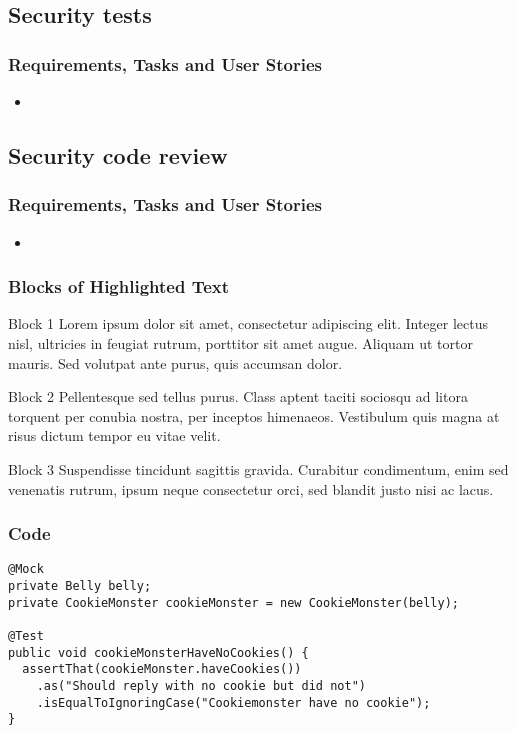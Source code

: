 \documentclass{beamer}
\begin{document}
  \subsection{Security tests}
    \begin{frame}
    \frametitle{Requirements, Tasks and User Stories}
    \begin{itemize}
    \item
    \end{itemize}
    \end{frame}

  \subsection{Security code review}
    \begin{frame}
    \frametitle{Requirements, Tasks and User Stories}
    \begin{itemize}
    \item
    \end{itemize}
    \end{frame}

\begin{frame}
\frametitle{Blocks of Highlighted Text}
\begin{block}{Block 1}
Lorem ipsum dolor sit amet, consectetur adipiscing elit. Integer lectus nisl, ultricies in feugiat rutrum, porttitor sit amet augue. Aliquam ut tortor mauris. Sed volutpat ante purus, quis accumsan dolor.
\end{block}

\begin{block}{Block 2}
Pellentesque sed tellus purus. Class aptent taciti sociosqu ad litora torquent per conubia nostra, per inceptos himenaeos. Vestibulum quis magna at risus dictum tempor eu vitae velit.
\end{block}

\begin{block}{Block 3}
Suspendisse tincidunt sagittis gravida. Curabitur condimentum, enim sed venenatis rutrum, ipsum neque consectetur orci, sed blandit justo nisi ac lacus.
\end{block}
\end{frame}

\begin{frame}[fragile]
\frametitle{Code}
\begin{example}[Code]
\begin{lstlisting}
@Mock
private Belly belly;
private CookieMonster cookieMonster = new CookieMonster(belly);

@Test
public void cookieMonsterHaveNoCookies() {
  assertThat(cookieMonster.haveCookies())
    .as("Should reply with no cookie but did not")
    .isEqualToIgnoringCase("Cookiemonster have no cookie");
}
\end{lstlisting}
\end{example}
\end{frame}
\end{document}
